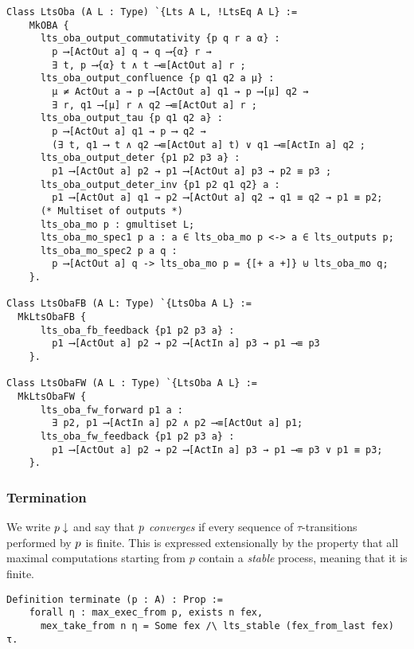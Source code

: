 \begin{mdframed}
  \begin{verbatim}
Class LtsOba (A L : Type) `{Lts A L, !LtsEq A L} :=
    MkOBA {
      lts_oba_output_commutativity {p q r a α} :
        p ⟶[ActOut a] q → q ⟶{α} r →
        ∃ t, p ⟶{α} t ∧ t ⟶≡[ActOut a] r ;
      lts_oba_output_confluence {p q1 q2 a μ} :
        μ ≠ ActOut a → p ⟶[ActOut a] q1 → p ⟶[μ] q2 →
        ∃ r, q1 ⟶[μ] r ∧ q2 ⟶≡[ActOut a] r ;
      lts_oba_output_tau {p q1 q2 a} :
        p ⟶[ActOut a] q1 → p ⟶ q2 →
        (∃ t, q1 ⟶ t ∧ q2 ⟶≡[ActOut a] t) ∨ q1 ⟶≡[ActIn a] q2 ;
      lts_oba_output_deter {p1 p2 p3 a} :
        p1 ⟶[ActOut a] p2 → p1 ⟶[ActOut a] p3 → p2 ≡ p3 ;
      lts_oba_output_deter_inv {p1 p2 q1 q2} a :
        p1 ⟶[ActOut a] q1 → p2 ⟶[ActOut a] q2 → q1 ≡ q2 → p1 ≡ p2;
      (* Multiset of outputs *)
      lts_oba_mo p : gmultiset L;
      lts_oba_mo_spec1 p a : a ∈ lts_oba_mo p <-> a ∈ lts_outputs p;
      lts_oba_mo_spec2 p a q :
        p ⟶[ActOut a] q -> lts_oba_mo p = {[+ a +]} ⊎ lts_oba_mo q;
    }.

Class LtsObaFB (A L: Type) `{LtsOba A L} :=
  MkLtsObaFB {
      lts_oba_fb_feedback {p1 p2 p3 a} :
        p1 ⟶[ActOut a] p2 → p2 ⟶[ActIn a] p3 → p1 ⟶≡ p3
    }.

Class LtsObaFW (A L : Type) `{LtsOba A L} :=
  MkLtsObaFW {
      lts_oba_fw_forward p1 a :
        ∃ p2, p1 ⟶[ActIn a] p2 ∧ p2 ⟶≡[ActOut a] p1;
      lts_oba_fw_feedback {p1 p2 p3 a} :
        p1 ⟶[ActOut a] p2 → p2 ⟶[ActIn a] p3 → p1 ⟶≡ p3 ∨ p1 ≡ p3;
    }.
  \end{verbatim}
\end{mdframed}

\subsubsection{Termination}

We write $p \downarrow$ and say that {\em $p$ converges} if every
sequence of $\tau$-transitions performed by $p$ is finite. This is
expressed extensionally by the property that all maximal computations starting
from $p$ contain a \emph{stable} process, meaning that it is finite.

\begin{mdframed}
\begin{verbatim}
Definition terminate (p : A) : Prop :=
    forall η : max_exec_from p, exists n fex,
      mex_take_from n η = Some fex /\ lts_stable (fex_from_last fex) τ.
\end{verbatim}
\end{mdframed}


